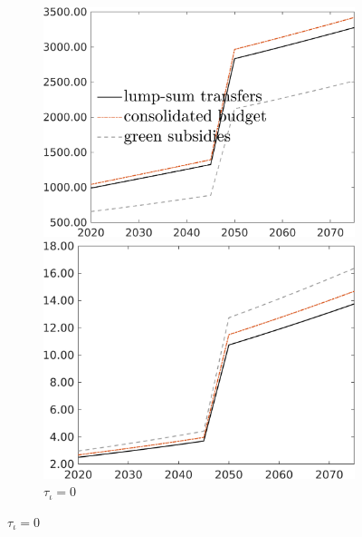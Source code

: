 \begin{figure}[h!!]
\begin{subfigure}{0.9\textwidth}
	\centering
	\caption{ $\tau_\iota=0$}
	\begin{minipage}[]{0.32\textwidth}
		\includegraphics[width=1\textwidth]{../../codding_model/own_basedOnFried/optimalPol_010922_revision/figures/all_13Sept22/CompRed_Taul0_Tauf_spillover0_knspil0_nsk0_xgr0_sep0_LFlimit1_emsbase0_countec0_GovRev0_etaa0.79_lgd1.png}
	\end{minipage}
	\begin{minipage}[]{0.32\textwidth}
		\includegraphics[width=1\textwidth]{../../codding_model/own_basedOnFried/optimalPol_010922_revision/figures/all_13Sept22/CompRed_Taul0_GFF_spillover0_knspil0_nsk0_xgr0_sep0_LFlimit1_emsbase0_countec0_GovRev0_etaa0.79_lgd0.png}

\end{minipage}
\end{subfigure}
\end{figure}
